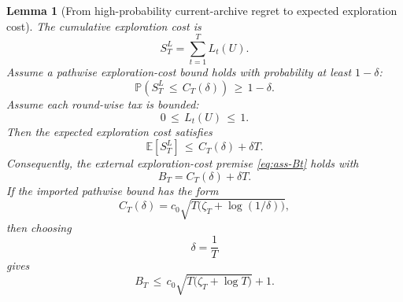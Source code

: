 \documentclass{article} %
\newtheorem{lemma}[theorem]{Lemma}
\begin{document}
\begin{lemma}[From high-probability current-archive regret to expected exploration cost]
\label{lem:16}
The cumulative exploration cost is
\begin{equation}
\label{eq:app-six-ST-def}
S_T^L
=
\sum_{t=1}^{T}L_t(U).
\end{equation}
Assume a pathwise exploration-cost bound holds with probability at least \(1-\delta\):
\begin{equation}
\label{eq:app-six-hp-event}
\mathbb{P}\!\left(S_T^L\,\le\, C_T(\delta)\right)\,\ge\, 1-\delta.
\end{equation}
Assume each round-wise tax is bounded:
\begin{equation}
\label{eq:app-six-L-unit-bound}
0\,\le\, L_t(U)\,\le\, 1.
\end{equation}
Then the expected exploration cost satisfies
\begin{equation}
\label{eq:app-six-expected-bridge}
\mathbb{E}[S_T^L]
\,\le\,
C_T(\delta)+\delta T.
\end{equation}
Consequently, the external exploration-cost premise
\eqref{eq:ass-Bt} holds with
\begin{equation}
\label{eq:app-six-BT-from-CT}
B_T
=
C_T(\delta)+\delta T.
\end{equation}
If the imported pathwise bound has the form
\begin{equation}
\label{eq:app-six-generic-CT}
C_T(\delta)
=
c_0\sqrt{T\bigl(\zeta_T+\log(1/\delta)\bigr)},
\end{equation}
then choosing
\begin{equation}
\label{eq:app-six-delta-choice}
\delta=\frac{1}{T}
\end{equation}
gives
\begin{equation}
\label{eq:app-six-generic-BT}
B_T
\,\le\,
c_0\sqrt{T\bigl(\zeta_T+\log T\bigr)}+1.
\end{equation}
\end{lemma}
\end{document}
